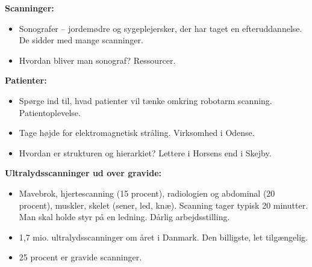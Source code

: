 \textbf{Scanninger:}
\begin{itemize}
\item Sonografer – jordemødre og sygeplejersker, der har taget en efteruddannelse. De sidder med mange scanninger. 
\item Hvordan bliver man sonograf? Ressourcer.
\end{itemize}
\textbf{Patienter:}
\begin{itemize}
\item Spørge ind til, hvad patienter vil tænke omkring robotarm scanning. Patientoplevelse.
\item Tage højde for elektromagnetisk stråling. Virksomhed i Odense. 
\item Hvordan er strukturen og hierarkiet? Lettere i Horsens end i Skejby.
\end{itemize}
\textbf{Ultralydsscanninger ud over gravide:}
\begin{itemize}
\item Mavebrok, hjertescanning (15 procent), radiologien og abdominal (20 procent), muskler, skelet (sener, led, knæ). Scanning tager typisk 20 minutter. Man skal holde styr på en ledning. Dårlig arbejdsstilling. 
\item 1,7 mio. ultralydsscanninger om året i Danmark. Den billigste, let tilgængelig. 
\item 25 procent er gravide scanninger.
\end{itemize}

\newpage